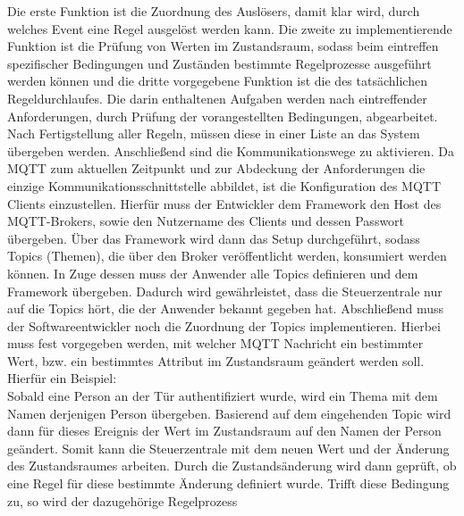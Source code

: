         Die erste Funktion ist die Zuordnung des Auslösers, damit klar wird, durch welches Event eine Regel ausgelöst werden kann. 
        Die zweite zu implementierende Funktion ist die Prüfung von Werten im Zustandsraum, sodass beim eintreffen spezifischer 
        Bedingungen und Zuständen bestimmte Regelprozesse ausgeführt werden können und die dritte vorgegebene Funktion ist die 
        des tatsächlichen Regeldurchlaufes. Die darin enthaltenen Aufgaben werden nach eintreffender Anforderungen, durch Prüfung der 
        vorangestellten Bedingungen, abgearbeitet.
        \\
        Nach Fertigstellung aller Regeln, müssen diese in einer Liste an das System übergeben werden. Anschließend sind die 
        Kommunikationswege zu aktivieren. 
        Da \acs{MQTT} zum aktuellen Zeitpunkt und zur Abdeckung der Anforderungen die einzige Kommunikationsschnittstelle 
        abbildet, ist die Konfiguration des \acs{MQTT} Clients einzustellen. Hierfür muss der Entwickler 
        dem Framework den Host des \acs{MQTT}-Brokers, sowie den Nutzername des Clients und dessen Passwort übergeben. Über das 
        Framework wird dann das Setup durchgeführt, sodass Topics (Themen), die über den Broker veröffentlicht werden, konsumiert 
        werden können. In Zuge dessen muss der Anwender alle Topics definieren und dem Framework übergeben. Dadurch wird gewährleistet, dass 
        die Steuerzentrale nur auf die Topics hört, die der Anwender bekannt gegeben hat. Abschließend muss der Softwareentwickler 
        noch die Zuordnung der Topics implementieren. Hierbei muss fest vorgegeben werden, mit welcher \acs{MQTT} Nachricht ein 
        bestimmter Wert, bzw. ein bestimmtes Attribut im Zustandsraum geändert werden soll. Hierfür ein Beispiel: 
        \\
        Sobald eine Person an der Tür authentifiziert wurde, wird ein Thema mit dem Namen derjenigen Person übergeben. Basierend auf 
        dem eingehenden Topic wird dann für dieses Ereignis der Wert im Zustandsraum auf den Namen der Person geändert. Somit kann 
        die Steuerzentrale mit dem neuen Wert und der Änderung des Zustandsraumes arbeiten. Durch die Zustandsänderung wird dann 
        geprüft, ob eine Regel für diese bestimmte Änderung definiert wurde. Trifft diese Bedingung zu, so wird der dazugehörige Regelprozess 
